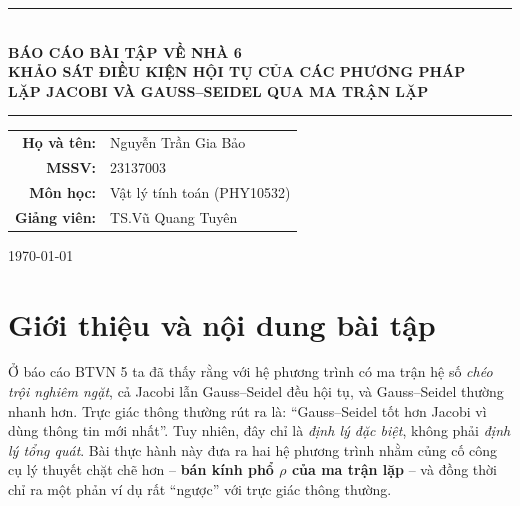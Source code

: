 \documentclass[12pt,a4paper]{article}
\begin{document}
\begin{titlepage}
    \centering
    \vspace*{2cm}

    \rule{\textwidth}{1pt} \\[0.5cm]
    {\huge \textbf{BÁO CÁO BÀI TẬP VỀ NHÀ 6}} \\[0.4cm]
    {\large \textbf{KHẢO SÁT ĐIỀU KIỆN HỘI TỤ CỦA CÁC PHƯƠNG PHÁP}} \\[0.2cm]
    {\large \textbf{LẶP JACOBI VÀ GAUSS--SEIDEL QUA MA TRẬN LẶP}} \\[0.2cm]
    \rule{\textwidth}{1pt}

    \vspace{2cm}

    {\large
    \begin{tabular}{rl}
        \textbf{Họ và tên:}  & Nguyễn Trần Gia Bảo \\[4pt]
        \textbf{MSSV:}       & 23137003 \\[4pt]
        \textbf{Môn học:}    & Vật lý tính toán (PHY10532) \\[4pt]
        \textbf{Giảng viên:} & TS.\@ Vũ Quang Tuyên \\
    \end{tabular}
    }

    \vfill
    {\large \today}
\end{titlepage}

\newpage
\tableofcontents
\newpage

\section{Giới thiệu và nội dung bài tập}

Ở báo cáo BTVN 5 ta đã thấy rằng với hệ phương trình có ma trận hệ số \emph{chéo trội nghiêm ngặt}, cả Jacobi lẫn Gauss--Seidel đều hội tụ, và Gauss--Seidel thường nhanh hơn. Trực giác thông thường rút ra là: ``Gauss--Seidel tốt hơn Jacobi vì dùng thông tin mới nhất''. Tuy nhiên, đây chỉ là \emph{định lý đặc biệt}, không phải \emph{định lý tổng quát}. Bài thực hành này đưa ra hai hệ phương trình nhằm củng cố công cụ lý thuyết chặt chẽ hơn -- \textbf{bán kính phổ $\rho$ của ma trận lặp} -- và đồng thời chỉ ra một phản ví dụ rất ``ngược'' với trực giác thông thường.
\end{document}
